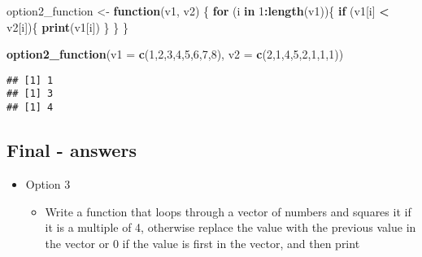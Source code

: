 \documentclass[]{article}
\newenvironment{Shaded}{\begin{snugshade}}{\end{snugshade}}
\newcommand{\KeywordTok}[1]{\textcolor[rgb]{0.13,0.29,0.53}{\textbf{#1}}}
\newcommand{\DataTypeTok}[1]{\textcolor[rgb]{0.13,0.29,0.53}{#1}}
\newcommand{\DecValTok}[1]{\textcolor[rgb]{0.00,0.00,0.81}{#1}}
\newcommand{\StringTok}[1]{\textcolor[rgb]{0.31,0.60,0.02}{#1}}
\newcommand{\ControlFlowTok}[1]{\textcolor[rgb]{0.13,0.29,0.53}{\textbf{#1}}}
\newcommand{\OperatorTok}[1]{\textcolor[rgb]{0.81,0.36,0.00}{\textbf{#1}}}
\newcommand{\NormalTok}[1]{#1}
\providecommand{\tightlist}{%
  \setlength{\itemsep}{0pt}\setlength{\parskip}{0pt}}
\begin{document}
\begin{Shaded}
\begin{Highlighting}[]
\NormalTok{option2_function <-}\StringTok{ }\ControlFlowTok{function}\NormalTok{(v1, v2) \{}
  \ControlFlowTok{for}\NormalTok{ (i }\ControlFlowTok{in} \DecValTok{1}\OperatorTok{:}\KeywordTok{length}\NormalTok{(v1))\{}
    \ControlFlowTok{if}\NormalTok{ (v1[i] }\OperatorTok{<}\StringTok{ }\NormalTok{v2[i])\{}
      \KeywordTok{print}\NormalTok{(v1[i])}
\NormalTok{      \}}
\NormalTok{  \}}
\NormalTok{\}}

\KeywordTok{option2_function}\NormalTok{(}\DataTypeTok{v1 =} \KeywordTok{c}\NormalTok{(}\DecValTok{1}\NormalTok{,}\DecValTok{2}\NormalTok{,}\DecValTok{3}\NormalTok{,}\DecValTok{4}\NormalTok{,}\DecValTok{5}\NormalTok{,}\DecValTok{6}\NormalTok{,}\DecValTok{7}\NormalTok{,}\DecValTok{8}\NormalTok{), }\DataTypeTok{v2 =} \KeywordTok{c}\NormalTok{(}\DecValTok{2}\NormalTok{,}\DecValTok{1}\NormalTok{,}\DecValTok{4}\NormalTok{,}\DecValTok{5}\NormalTok{,}\DecValTok{2}\NormalTok{,}\DecValTok{1}\NormalTok{,}\DecValTok{1}\NormalTok{,}\DecValTok{1}\NormalTok{))}
\end{Highlighting}
\end{Shaded}

\begin{verbatim}
## [1] 1
## [1] 3
## [1] 4
\end{verbatim}

\subsection{Final - answers}\label{final---answers-2}

\begin{itemize}
\tightlist
\item
  Option 3

  \begin{itemize}
  \tightlist
  \item
    Write a function that loops through a vector of numbers and squares
    it if it is a multiple of 4, otherwise replace the value with the
    previous value in the vector or 0 if the value is first in the
    vector, and then print
  \end{itemize}
\end{itemize}
\end{document}
